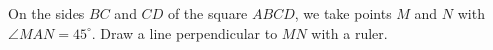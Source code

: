 On the sides $BC$ and $CD$ of the square $ABCD$, we take points $M$ and $N$ with $\angle MAN = 45^\circ$. Draw a line perpendicular to $MN$ with a ruler.
